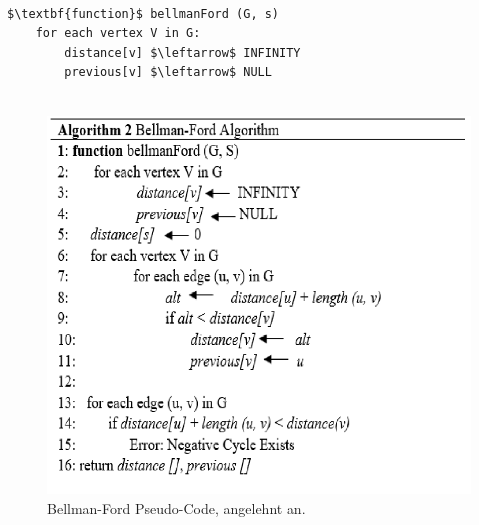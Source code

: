 \noindent \\
\begin{minipage}{1.0\textwidth} \small
\begin{lstlisting}[label=lst:Bellman-Ford]
$\textbf{function}$ bellmanFord (G, s)
	for each vertex V in G:
		distance[v] $\leftarrow$ INFINITY
		previous[v] $\leftarrow$ NULL
		
\end{lstlisting}
\end{minipage}


\begin{figure}[H]
	\centering
	\includegraphics[width=1.0\textwidth]{images/Bellman-Ford-Algorithmus_Pseudo-Code.PNG}
	\caption{Bellman-Ford Pseudo-Code, angelehnt an\cite{Abusalim2020}.}
	\label{fig:Bellman-Ford Pseudo-code}
\end{figure}






